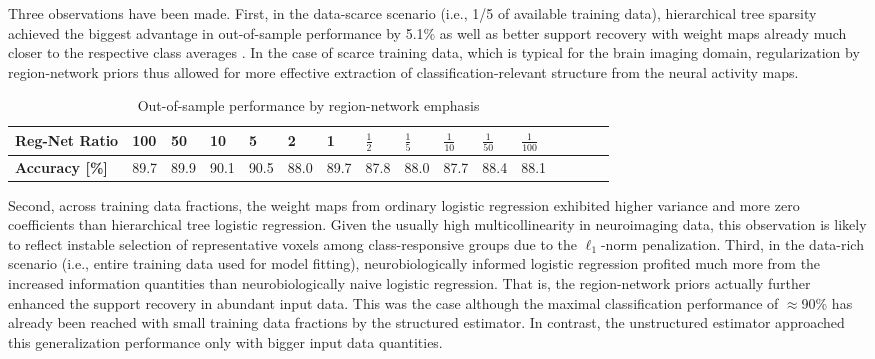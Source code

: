 \documentclass[runningheads,a4paper]{llncs}
\begin{document}
%
Three observations have been made.
First,
in the data-scarce scenario (i.e., 1/5 of available training data),
hierarchical tree sparsity achieved the biggest advantage
in out-of-sample performance by 5.1\% as well as
better support recovery with weight maps already much closer
to the respective class averages
\cite{varoquaux2012small}.
In the case of scarce training data, which is typical for the brain imaging domain,
regularization by region-network priors thus allowed for
more effective extraction of classification-relevant structure
from the neural activity maps.
\begin{table}[]
  \vspace{-0.6cm}
  \centering
  \caption{Out-of-sample performance by region-network emphasis}
  \vspace{-0.3cm}
  \begin{tabular}{l|l|l|l|l|l|l|l|l|l|l|l|l|l|l|l}
    \textbf{Reg-Net Ratio}          & 100   & 50    & 10   & 5     & 2    & 1     & $\frac{1}{2}$  & $\frac{1}{5}$  & $\frac{1}{10}$ & $\frac{1}{50}$ & $\frac{1}{100}$ \\ \hline
    \textbf{Accuracy {[}\%{]}}             & 89.7  & 89.9  & 90.1 & 90.5  & 88.0 & 89.7  & 87.8           & 88.0           & 87.7           & 88.4           & 88.1  
  \end{tabular}
  \vspace{-0.6cm}
  \label{table_reg_net_ratio}
\end{table}
%
Second,
across training data fractions,
the weight maps from ordinary logistic regression exhibited
higher variance and more zero coefficients
than hierarchical tree logistic regression.
Given the usually high multicollinearity in neuroimaging data,
this observation is likely to reflect instable selection of
representative voxels among class-responsive groups
due to the $\ell_1$-norm penalization.
%
Third,
in the data-rich scenario (i.e., entire training data used for model fitting),
neurobiologically informed logistic regression
profited much more from the increased information quantities than
neurobiologically naive logistic regression.
That is, the region-network priors actually further enhanced the support
recovery in abundant input data.
This was the case although
the maximal classification performance of $\approx$90\% has already
been reached with small training data fractions by the structured estimator.
In contrast, 
the unstructured estimator approached this generalization performance
only with bigger input data quantities.
%
\end{document}
